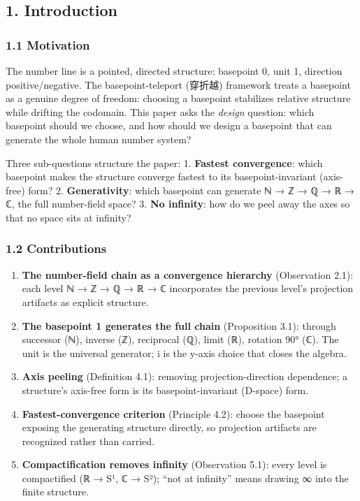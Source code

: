\documentclass[
]{article}
\providecommand{\tightlist}{%
  \setlength{\itemsep}{0pt}\setlength{\parskip}{0pt}}
\begin{document}
\subsection{1. Introduction}\label{introduction}

\subsubsection{1.1 Motivation}\label{motivation}

The number line is a pointed, directed structure: basepoint 0, unit 1,
direction positive/negative. The basepoint-teleport (穿折越) framework
treats a basepoint as a genuine degree of freedom: choosing a basepoint
stabilizes relative structure while drifting the codomain. This paper
asks the \emph{design} question: which basepoint should we choose, and
how should we design a basepoint that can generate the whole human
number system?

Three sub-questions structure the paper: 1. \textbf{Fastest
convergence}: which basepoint makes the structure converge fastest to
its basepoint-invariant (axis-free) form? 2. \textbf{Generativity}:
which basepoint can generate ℕ → ℤ → ℚ → ℝ → ℂ, the full number-field
space? 3. \textbf{No infinity}: how do we peel away the axes so that no
space sits at infinity?

\subsubsection{1.2 Contributions}\label{contributions}

\begin{enumerate}
\def\labelenumi{\arabic{enumi}.}
\tightlist
\item
  \textbf{The number-field chain as a convergence hierarchy}
  (Observation 2.1): each level ℕ → ℤ → ℚ → ℝ → ℂ incorporates the
  previous level's projection artifacts as explicit structure.
\item
  \textbf{The basepoint 1 generates the full chain} (Proposition 3.1):
  through successor (ℕ), inverse (ℤ), reciprocal (ℚ), limit (ℝ),
  rotation 90° (ℂ). The unit is the universal generator; i is the y-axis
  choice that closes the algebra.
\item
  \textbf{Axis peeling} (Definition 4.1): removing projection-direction
  dependence; a structure's axis-free form is its basepoint-invariant
  (D-space) form.
\item
  \textbf{Fastest-convergence criterion} (Principle 4.2): choose the
  basepoint exposing the generating structure directly, so projection
  artifacts are recognized rather than carried.
\item
  \textbf{Compactification removes infinity} (Observation 5.1): every
  level is compactified (ℝ → S¹, ℂ → S²); ``not at infinity'' means
  drawing ∞ into the finite structure.
\end{enumerate}
\end{document}
